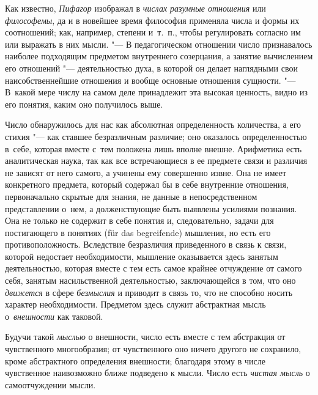 Как известно, {\em Пифагор} изображал в {\em числах разумные отношения} или
{\em философемы}, да и в новейшее время философия применяла числа и формы их
соотношений; как, например, степени и~т.~п., чтобы регулировать согласно им или
выражать в них мысли. "--- В педагогическом отношении число признавалось
наиболее подходящим предметом внутреннего созерцания, а занятие вычислением его
отношений "--- деятельностью духа, в которой он делает наглядными свои
наисобственнейшие отношения и вообще основные отношения сущности. "--- В~какой
мере числу на самом деле принадлежит эта высокая ценность, видно из его
понятия, каким оно получилось выше.

Число обнаружилось для нас как абсолютная определенность количества, а его
стихия "--- как ставшее безразличным различие; оно оказалось определенностью
в~себе, которая вместе с~тем положена лишь вполне внешне. Арифметика есть
аналитическая наука, так как все встречающиеся в ее предмете связи и различия
не зависят от него самого, а учинены ему совершенно извне. Она не имеет
конкретного предмета, который содержал бы в себе внутренние отношения,
первоначально скрытые для знания, не данные в непосредственном представлении
о~нем, а долженствующие быть выявлены усилиями познания. Она не только не
содержит в себе понятия и, следовательно, задачи для постигающего в понятиях
(für das begrei\-fende) мышления, но есть его противоположность. Вследствие
безразличия приведенного в связь к связи, которой недостает необходимости,
мышление оказывается здесь занятым деятельностью, которая вместе с тем есть
самое крайнее отчуждение от самого себя, занятым насильственной деятельностью,
заключающейся в том, что оно {\em движется} в сфере {\em безмыслия} и приводит
в связь то, что не способно носить характер необходимости. Предметом здесь
служит абстрактная мысль о~{\em внешности} как таковой.

Будучи такой {\em мыслью} о внешности, число есть вместе с тем абстракция от
чувственного многообразия; от чувственного оно ничего другого не сохранило,
кроме абстрактного определения внешности; благодаря этому в числе чувственное
наивозможно ближе подведено к мысли. Число есть {\em чистая мысль} о
самоотчуждении мысли.

